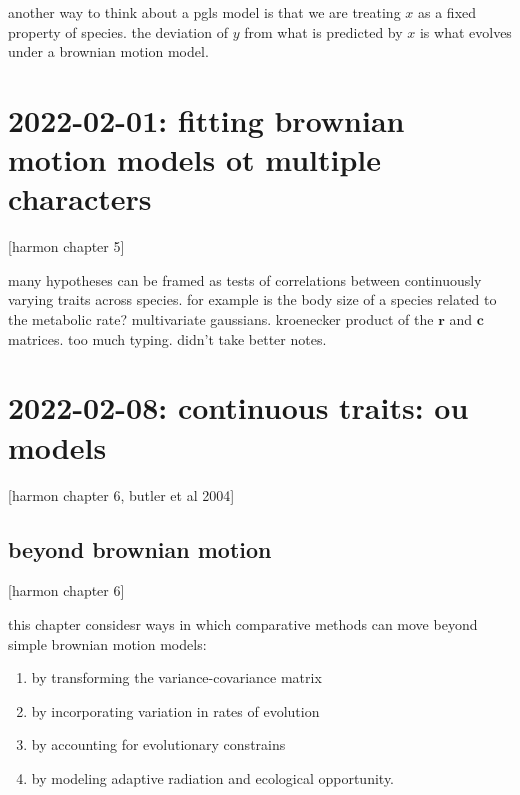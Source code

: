 \documentclass{article}
\begin{document}
another way to think about a pgls model is that we are treating $x$ as a fixed
property of species. the deviation of $y$ from what is predicted by $x$ is what
evolves under a brownian motion model.
\section{2022-02-01: fitting brownian motion models ot multiple characters}
[harmon chapter 5]

many hypotheses can be framed as tests of correlations between continuously varying traits across species. for example is the body size of a species related to the metabolic rate? multivariate gaussians. kroenecker product of the $\mathbf{r}$ and $\mathbf{c}$ matrices. too much typing. didn't take better notes.

\section{2022-02-08: continuous traits: ou models}
[harmon chapter 6, butler et al 2004]

\subsection{beyond brownian motion}
[harmon chapter 6]

this chapter considesr ways in which comparative methods can move beyond simple
brownian motion models:
\begin{enumerate}
  \item by transforming the variance-covariance matrix
  \item by incorporating variation in rates of evolution
  \item by accounting for evolutionary constrains
  \item by modeling adaptive radiation and ecological opportunity.
\end{enumerate}
\end{document}
